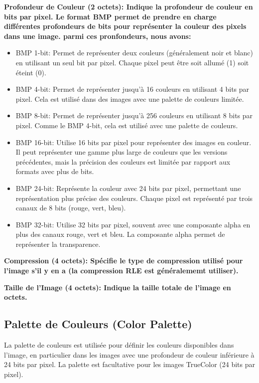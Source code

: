 \documentclass{article}
\begin{document}
\bfseries Profondeur de Couleur (2 octets)\normalfont : Indique la profondeur de couleur en bits par pixel. Le format BMP permet de prendre en charge différentes profondeurs de bits pour représenter la couleur des pixels dans une image. parmi ces pronfondeurs, nous avons:
\begin{itemize}
\item BMP 1-bit: Permet de représenter deux couleurs (généralement noir et blanc) en utilisant un seul bit par pixel. Chaque pixel peut être soit allumé (1) soit éteint (0).

\item BMP 4-bit: Permet de représenter jusqu'à 16 couleurs en utilisant 4 bits par pixel. Cela est utilisé dans des images avec une palette de couleurs limitée.

\item BMP 8-bit: Permet de représenter jusqu'à 256 couleurs en utilisant 8 bits par pixel. Comme le BMP 4-bit, cela est utilisé avec une palette de couleurs.

\item BMP 16-bit: Utilise 16 bits par pixel pour représenter des images en couleur. Il peut représenter une gamme plus large de couleurs que les versions précédentes, mais la précision des couleurs est limitée par rapport aux formats avec plus de bits.

\item BMP 24-bit: Représente la couleur avec 24 bits par pixel, permettant une représentation plus précise des couleurs. Chaque pixel est représenté par trois canaux de 8 bits (rouge, vert, bleu).

\item BMP 32-bit: Utilise 32 bits par pixel, souvent avec une composante alpha en plus des canaux rouge, vert et bleu. La composante alpha permet de représenter la transparence.
\end{itemize}
\bfseries Compression (4 octets)\normalfont : Spécifie le type de compression utilisé pour l'image s'il y en a (la compression RLE est généralememt utiliser).

\bfseries Taille de l'Image (4 octets)\normalfont : Indique la taille totale de l'image en octets.

\subsection{Palette de Couleurs (Color Palette)}
La palette de couleurs est utilisée pour définir les couleurs disponibles dans l'image, en particulier dans les images avec une profondeur de couleur inférieure à 24 bits par pixel. La palette est facultative pour les images TrueColor (24 bits par pixel).
\end{document}
